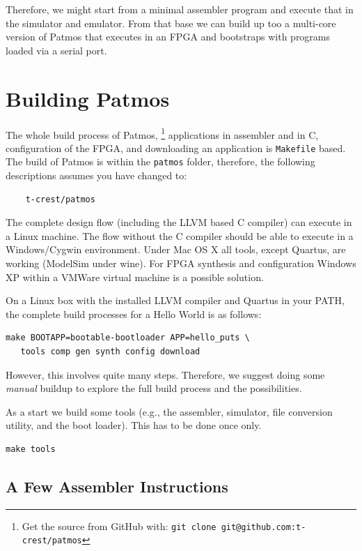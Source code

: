 \documentclass[a4paper,fontsize=10pt,twoside,DIV15,BCOR12mm,headinclude=true,footinclude=false,pagesize,bibtotoc]{scrbook}
\newcommand{\code}[1]{{\texttt{#1}}}
\begin{document}
Therefore, we might start from a minimal assembler program and execute
that in the simulator and emulator. From that base we can build up too
a multi-core version of Patmos that executes in an FPGA and bootstraps
with programs loaded via a serial port.


\section{Building Patmos}

The whole build process of Patmos,%
\footnote{Get the source from GitHub with: \code{git clone git@github.com:t-crest/patmos}}
applications in assembler
and in C, configuration of the FPGA, and downloading an application
is \code{Makefile} based. The build of Patmos is within the \code{patmos} folder,
therefore, the following descriptions assumes you have changed to:

\begin{verbatim}
    t-crest/patmos
\end{verbatim}


The complete design flow (including the LLVM
based C compiler) can execute in a Linux machine. The flow without
the C compiler should be able to execute in a Windows/Cygwin environment.
Under Mac OS X all tools, except Quartus, are working (ModelSim under
wine). For FPGA synthesis and configuration Windows XP within a VMWare
virtual machine is a possible solution.

On a Linux box with the installed LLVM compiler and Quartus in your PATH,
the complete build processes for a Hello World is as follows:

\begin{verbatim}
make BOOTAPP=bootable-bootloader APP=hello_puts \
   tools comp gen synth config download
\end{verbatim}

However, this involves quite many steps. Therefore, we suggest doing some \emph{manual}
buildup to explore the full build process and the possibilities.

As a start we build some tools (e.g., the assembler, simulator, file conversion
utility, and the boot loader). This has to be done once only.

\begin{verbatim}
make tools
\end{verbatim}

\subsection{A Few Assembler Instructions}
\end{document}
